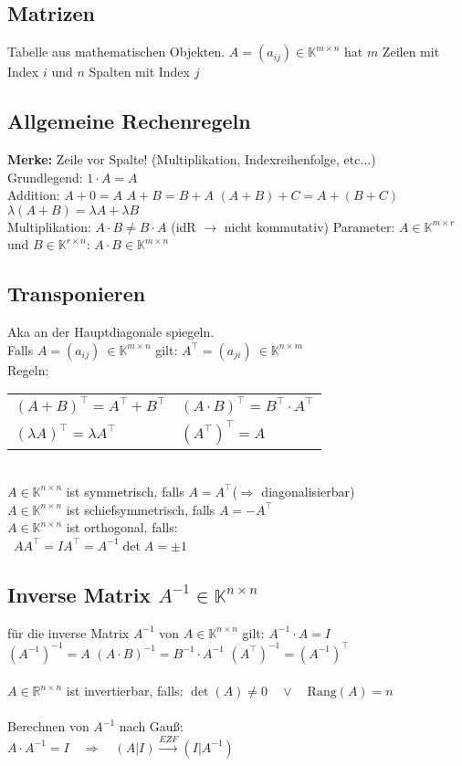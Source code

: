 \documentclass[7pt,a4paper]{scrartcl}
\newcommand{\K}{\ensuremath{\mathbb K}}
\begin{document}
\begin{multicols}{3}
\section{Matrizen}
Tabelle aus mathematischen Objekten. $A=(a_{ij}) \in \mathbb K^{m\times n}$ hat $m$ Zeilen mit Index $i$ und $n$ Spalten mit Index $j$

\subsection{Allgemeine Rechenregeln}
\textbf{Merke:} Zeile vor Spalte! (Multiplikation, Indexreihenfolge, etc...)\\
Grundlegend: $1 \cdot A=A$ \\
Addition: $A+0=A$ \quad $A+B=B+A$ \quad $(A+B)+C=A+(B+C)$ \quad $\lambda (A+B) = \lambda A + \lambda B$ \\
Multiplikation: $A \cdot B \ne B \cdot A$ (idR $\rightarrow$ nicht kommutativ) \quad Parameter: $A\in \K^{m\times r}$ und $B\in \K^{r\times n}$: $A \cdot B\in\mathbb K^{m\times n}$

\subsection{Transponieren}
Aka an der Hauptdiagonale spiegeln.\\
Falls $A=(a_{ij})\ \in \mathbb K^{m\times n}$ gilt: $A^\top=(a_{ji})\ \in \mathbb K^{n\times m}$\\
Regeln:
\begin{tabular}{ll}
$(A+B)^\top=A^\top+B^\top$ & $(A\cdot B)^\top=B^\top\cdot A^\top$\qquad \\ $(\lambda A)^\top=\lambda A^\top$ & $(A^\top)^\top=A$\\
\end{tabular}
\\
$A\in \mathbb K^{n\times n}$ ist symmetrisch, falls $A=A^\top$\qquad ($\Rightarrow$ diagonalisierbar)\\
$A\in \mathbb K^{n\times n}$ ist schiefsymmetrisch, falls $A=-A^\top$\\
$A\in \mathbb K^{n\times n}$ ist orthogonal, falls:\\
\qquad\ $AA^\top=I$\qquad $A^\top=A^{-1}$\qquad $\det A=\pm 1$

\subsection{Inverse Matrix $A^{-1}\in \mathbb K^{n\times n}$}
für die inverse Matrix $A^{-1}$ von $A\in \mathbb K^{n\times n}$ gilt: $A^{-1}\cdot A=I$\\
$(A^{-1})^{-1}=A$ \qquad $(A\cdot B)^{-1}=B^{-1}\cdot A^{-1}$ \qquad $(A^\top)^{-1}=(A^{-1})^\top$\\
\\
$A \in \mathbb R^{n\times n}$ ist invertierbar, falls: $\det (A) \ne 0 \quad \lor \quad \mathrm{Rang}(A)=n$\\
\\
Berechnen von $A^{-1}$ nach Gauß:\\
$A\cdot A^{-1}=I\quad\Rightarrow\quad (A|I)\overset{EZF}{\longrightarrow}(I|A^{-1})$


\end{multicols}
\end{document}
